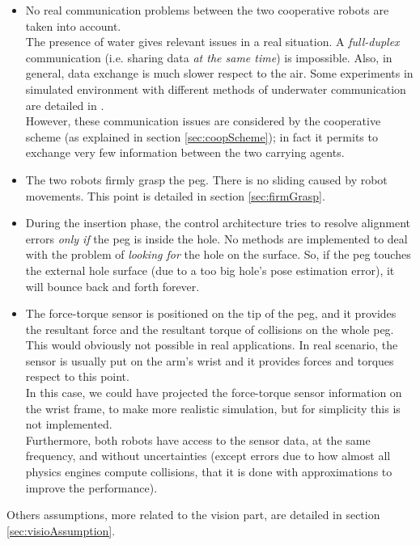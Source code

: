 \begin{itemize}
	
	\item No real communication problems between the two cooperative robots are taken into account.\\
	The presence of water gives relevant issues in a real situation. A \textit{full-duplex} communication (i.e. sharing data \textit{at the same time}) is impossible. Also, in general, data exchange is much slower respect to the air. Some experiments in simulated environment with different methods of underwater communication are detailed in \cite{IntroMaris2}.\\
	However, these communication issues are considered by the cooperative scheme (as explained in section \ref{sec:coopScheme}); in fact it permits to exchange very few information between the two carrying agents.
	
	\item The two robots firmly grasp the peg. There is no sliding caused by robot movements. This point is detailed in section \ref{sec:firmGrasp}.
	
	\item During the insertion phase, the control architecture tries to resolve alignment errors \textit{only if} the peg is inside the hole. No methods are implemented to deal with the problem of \textit{looking for} the hole on the surface. So, if the peg touches the external hole surface (due to a too big hole's pose estimation error), it will bounce back and forth forever.
	
	\item The force-torque sensor is positioned on the tip of the peg, and it provides the resultant force and the resultant torque of collisions on the whole peg.\\
	This would obviously not possible in real applications. In real scenario, the sensor is usually put on the arm's wrist and it provides forces and torques respect to this point.\\
	In this case, we could have projected the force-torque sensor information on the wrist frame, to make more realistic simulation, but for simplicity this is not implemented.\\
	Furthermore, both robots have access to the sensor data, at the same frequency, and without uncertainties (except errors due to how almost all physics engines compute collisions, that it is done with approximations to improve the performance).
	
\end{itemize}

\noindent Others assumptions, more related to the vision part, are detailed in section \ref{sec:visioAssumption}.

